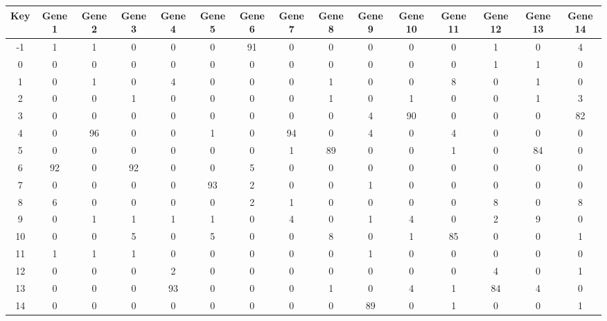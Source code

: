 \begin{tabular}{|c|c|c|c|c|c|c|c|c|c|c|c|c|c|c|}
\hline
Key & Gene 1 & Gene 2 & Gene 3 & Gene 4 & Gene 5 & Gene 6 & Gene 7 & Gene 8 & Gene 9 & Gene 10 & Gene 11 & Gene 12 & Gene 13 & Gene 14 \\
\hline
-1 & 1 & 1 & 0 & 0 & 0 & 91 & 0 & 0 & 0 & 0 & 0 & 1 & 0 & 4 \\
0 & 0 & 0 & 0 & 0 & 0 & 0 & 0 & 0 & 0 & 0 & 0 & 1 & 1 & 0 \\
1 & 0 & 1 & 0 & 4 & 0 & 0 & 0 & 1 & 0 & 0 & 8 & 0 & 1 & 0 \\
2 & 0 & 0 & 1 & 0 & 0 & 0 & 0 & 1 & 0 & 1 & 0 & 0 & 1 & 3 \\
3 & 0 & 0 & 0 & 0 & 0 & 0 & 0 & 0 & 4 & 90 & 0 & 0 & 0 & 82 \\
4 & 0 & 96 & 0 & 0 & 1 & 0 & 94 & 0 & 4 & 0 & 4 & 0 & 0 & 0 \\
5 & 0 & 0 & 0 & 0 & 0 & 0 & 1 & 89 & 0 & 0 & 1 & 0 & 84 & 0 \\
6 & 92 & 0 & 92 & 0 & 0 & 5 & 0 & 0 & 0 & 0 & 0 & 0 & 0 & 0 \\
7 & 0 & 0 & 0 & 0 & 93 & 2 & 0 & 0 & 1 & 0 & 0 & 0 & 0 & 0 \\
8 & 6 & 0 & 0 & 0 & 0 & 2 & 1 & 0 & 0 & 0 & 0 & 8 & 0 & 8 \\
9 & 0 & 1 & 1 & 1 & 1 & 0 & 4 & 0 & 1 & 4 & 0 & 2 & 9 & 0 \\
10 & 0 & 0 & 5 & 0 & 5 & 0 & 0 & 8 & 0 & 1 & 85 & 0 & 0 & 1 \\
11 & 1 & 1 & 1 & 0 & 0 & 0 & 0 & 0 & 1 & 0 & 0 & 0 & 0 & 0 \\
12 & 0 & 0 & 0 & 2 & 0 & 0 & 0 & 0 & 0 & 0 & 0 & 4 & 0 & 1 \\
13 & 0 & 0 & 0 & 93 & 0 & 0 & 0 & 1 & 0 & 4 & 1 & 84 & 4 & 0 \\
14 & 0 & 0 & 0 & 0 & 0 & 0 & 0 & 0 & 89 & 0 & 1 & 0 & 0 & 1 \\
\hline
\end{tabular}